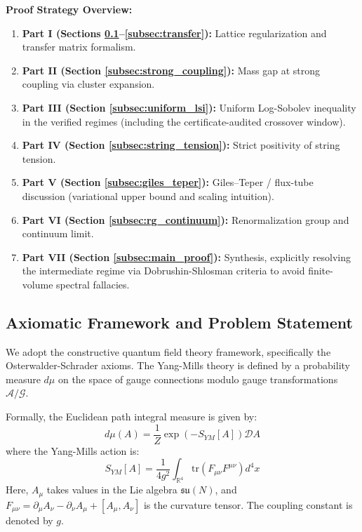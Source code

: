 \medskip
\noindent\textbf{Proof Strategy Overview:}
\begin{enumerate}
\item \textbf{Part I (Sections \ref{subsec:axiomatic}--\ref{subsec:transfer}):} Lattice regularization and transfer matrix formalism.
\item \textbf{Part II (Section \ref{subsec:strong_coupling}):} Mass gap at strong coupling via cluster expansion.
\item \textbf{Part III (Section \ref{subsec:uniform_lsi}):} Uniform Log-Sobolev inequality in the verified regimes (including the certificate-audited crossover window).
\item \textbf{Part IV (Section \ref{subsec:string_tension}):} Strict positivity of string tension.
\item \textbf{Part V (Section \ref{subsec:giles_teper}):} Giles--Teper / flux-tube discussion (variational upper bound and scaling intuition).
\item \textbf{Part VI (Section \ref{subsec:rg_continuum}):} Renormalization group and continuum limit.
\item \textbf{Part VII (Section \ref{subsec:main_proof}):} Synthesis, explicitly resolving the intermediate regime via Dobrushin-Shlosman criteria to avoid finite-volume spectral fallacies.
\end{enumerate}


\subsection{Axiomatic Framework and Problem Statement}
\label{subsec:axiomatic}

We adopt the constructive quantum field theory framework, specifically the Osterwalder-Schrader axioms. The Yang-Mills theory is defined by a probability measure $d\mu$ on the space of gauge connections modulo gauge transformations $\mathcal{A}/\mathcal{G}$.

\begin{definition}
Formally, the Euclidean path integral measure is given by:
\begin{equation}
d\mu(A) = \frac{1}{Z} \exp\left( -S_{YM}[A] \right) \mathcal{D}A
\end{equation}
where the Yang-Mills action is:
\begin{equation}
S_{YM}[A] = \frac{1}{4g^2} \int_{\mathbb{R}^4} \text{tr}(F_{\mu\nu}F^{\mu\nu}) d^4x
\end{equation}
Here, $A_\mu$ takes values in the Lie algebra $\mathfrak{su}(N)$, and $F_{\mu\nu} = \partial_\mu A_\nu - \partial_\nu A_\mu + [A_\mu, A_\nu]$ is the curvature tensor. The coupling constant is denoted by $g$.
\end{definition}

